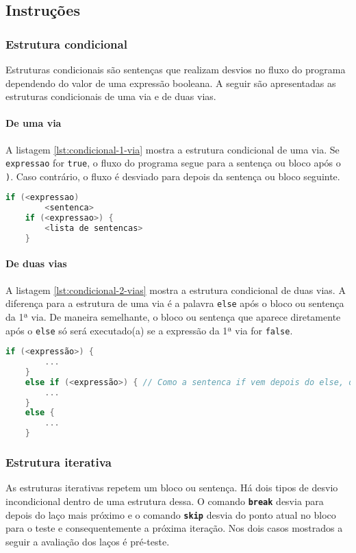 \subsection{Instruções}

\subsubsection{Estrutura condicional}
Estruturas condicionais são sentenças que realizam desvios no fluxo do programa dependendo do valor de uma expressão
booleana.
A seguir são apresentadas as estruturas condicionais de uma via e de duas vias.

\paragraph{De uma via}
A listagem \ref{lst:condicional-1-via} mostra a estrutura condicional de uma via.
Se \texttt{expressao} for \texttt{true}, o fluxo do programa segue para a sentença ou bloco após o \texttt{)}.
Caso contrário, o fluxo é desviado para depois da sentença ou bloco seguinte.

\begin{lstlisting}[language=C, caption=Estrutura condicional de uma via, label=lst:condicional-1-via]
    if (<expressao)
        <sentenca>
    if (<expressao>) {
        <lista de sentencas>
    }
\end{lstlisting}

\paragraph{De duas vias}
A listagem \ref{lst:condicional-2-vias} mostra a estrutura condicional de duas vias.
A diferença para a estrutura de uma via é a palavra \texttt{else} após o bloco ou sentença da 1ª via.
De maneira semelhante, o bloco ou sentença que aparece diretamente após o \texttt{else} só será executado(a) se a
expressão da 1ª via for \texttt{false}.

\begin{lstlisting}[language=C, caption=Estrutura condicional de uma via, label=lst:condicional-2-vias]
    if (<expressão>) {
        ...
    }
    else if (<expressão>) { // Como a sentenca if vem depois do else, o else mais abaixo corresponde a esse if
        ...
    }
    else {
        ...
    }
\end{lstlisting}

\subsubsection{Estrutura iterativa}
As estruturas iterativas repetem um bloco ou sentença. Há dois tipos de desvio incondicional dentro de uma estrutura dessa.
O comando \texttt{\textbf{break}} desvia para depois do laço mais próximo e o comando \texttt{\textbf{skip}} desvia do
ponto atual no bloco para o teste e consequentemente a próxima iteração. Nos dois casos mostrados a seguir a avaliação
dos laços é pré-teste.

